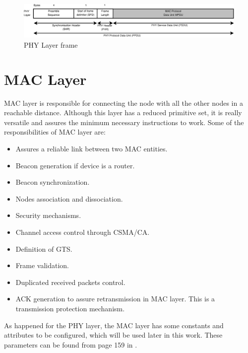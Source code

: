 \begin{itemize}
\vspace*{1cm}

\begin{figure}[ht]
 \begin{center}
  \includegraphics[width=1\textwidth]{PPDU.eps}
 \end{center}
 \caption{\ac{PHY} Layer frame \cite{IEEE802.15.4-2006}}
 \label{fig:PPDU}
\end{figure}
\end{itemize}

\section{\ac{MAC} Layer}

\ac{MAC} layer is responsible for connecting the node with all the other nodes in a reachable distance. Although this layer has a reduced
primitive set, it is really versatile and assures the minimum necessary instructions to work. Some of the responsibilities of \ac{MAC}
layer are:

\begin{itemize}
 \item Assures a reliable link between two \ac{MAC} entities.
 \item Beacon generation if device is a router.
 \item Beacon synchronization.
 \item Nodes association and dissociation.
 \item Security mechanisms.
 \item Channel access control through \ac{CSMA/CA}.
 \item Definition of \ac{GTS}.
 \item Frame validation.
 \item Duplicated received packets control.
 \item \ac{ACK} generation to assure retransmission in \ac{MAC} layer. This is a transmission protection mechanism.
\end{itemize}

As happened for the \ac{PHY} layer, the \ac{MAC} layer has some constants and attributes to be configured, which will be used later in this work.
These parameters can be found from page 159 in \cite{IEEE802.15.4-2006}.

